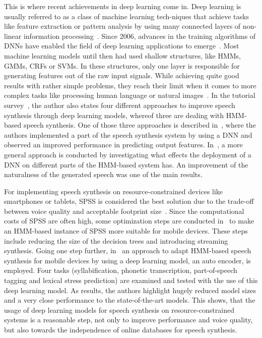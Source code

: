 \noindent This is where recent achievements in deep learning come in. Deep learning is usually referred to as a class of machine learning  tech-\break niques that achieve tasks like feature extraction or pattern analysis by using many connected layers of non-linear information processing~\cite{ling:deep, li:survey}. Since 2006, advances in the training algorithms of \acp{DNN} have enabled the field of deep learning applications to emerge~\cite{boros:robust}. Most machine learning models until then had used shallow structures, like \acp{HMM}, \acp{GMM}, \acp{CRF} or \acp{SVM}. In these structures, only one layer is responsible for generating features out of the raw input signals. While achieving quite good results with rather simple problems, they reach their limit when it comes to more complex tasks like processing human language or natural images~\cite{li:survey}. In the tutorial survey~\cite{li:survey}, the author also states four different approaches to improve speech synthesis through deep learning models, whereof three are dealing with \ac{HMM}-based speech synthesis. One of those three approaches is described in~\cite{zen:deepstatistical}, where the authors implemented a part of the speech synthesis system by using a \ac{DNN} and observed an improved performance in predicting output features. In~\cite{hashimoto:effect}, a more general approach is conducted by investigating what effects the deployment of a \ac{DNN} on different parts of the \ac{HMM}-based system has. An improvement of the naturalness of the generated speech was one of the main results.

For implementing speech synthesis on resource-constrained devices like smartphones or tablets, \ac{SPSS} is considered the best solution due to the trade-off between voice quality and acceptable footprint size~\cite{toth:optimizing}. Since the computational costs of \ac{SPSS} are often high, some optimization steps are conducted in~\cite{toth:optimizing} to make an \ac{HMM}-based instance of \ac{SPSS} more suitable for mobile devices. These steps include reducing the size of the decision trees and introducing streaming synthesis. Going one step further, in~\cite{boros:robust} an approach to adapt \ac{HMM}-based speech synthesis for mobile devices by using a deep learning model, an auto encoder, is employed. Four tasks (syllabification, phonetic transcription, part-of-speech tagging and lexical stress prediction) are examined and tested with the use of this deep learning model. As results, the authors highlight hugely reduced model sizes and a very close performance to the state-of-the-art models. This shows, that the usage of deep learning models for speech synthesis on resource-constrained systems is a reasonable step, not only to improve performance and voice quality, but also towards the independence of online databases for speech synthesis.

